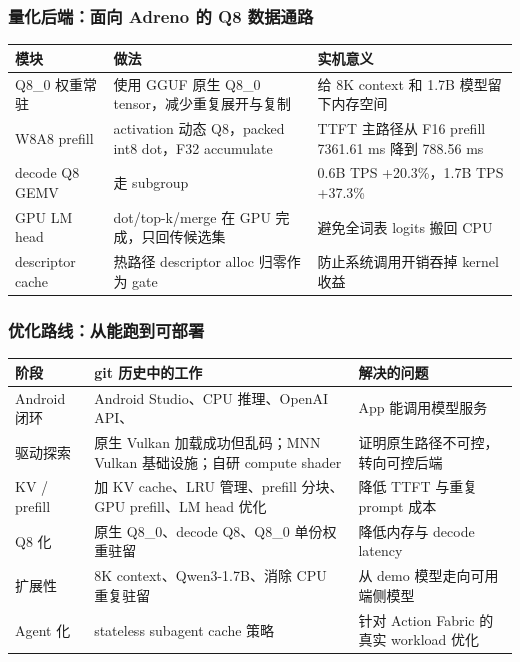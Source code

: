 \begin{frame}
  \frametitle{量化后端：面向 Adreno 的 Q8 数据通路}
  \scriptsize
  \begin{tabularx}{\textwidth}{p{}Y Y}
    \toprule
    模块 & 做法 & 实机意义 \\
    \midrule
    Q8\_0 权重常驻 & 使用 GGUF 原生 Q8\_0 tensor，减少重复展开与复制 & 给 8K context 和 1.7B 模型留下内存空间 \\
    W8A8 prefill & activation 动态 Q8，packed int8 dot，F32 accumulate & TTFT 主路径从 F16 prefill 7361.61 ms 降到 788.56 ms \\
    decode Q8 GEMV &  走 subgroup  & 0.6B TPS +20.3\%，1.7B TPS +37.3\% \\
    GPU LM head & dot/top-k/merge 在 GPU 完成，只回传候选集 & 避免全词表 logits 搬回 CPU \\
    descriptor cache & 热路径 descriptor alloc 归零作为 gate & 防止系统调用开销吞掉 kernel 收益 \\
    \bottomrule
  \end{tabularx}

  \vspace{0.45em}
  \normalsize
\end{frame}

\begin{frame}
  \frametitle{优化路线：从能跑到可部署}
  \scriptsize
  \begin{tabularx}{\textwidth}{p{}Y Y}
    \toprule
    阶段 & git 历史中的工作 & 解决的问题 \\
    \midrule
    Android 闭环 & Android Studio、CPU 推理、OpenAI API、 & App 能调用模型服务 \\
    驱动探索 & 原生 Vulkan 加载成功但乱码；MNN Vulkan 基础设施；自研 compute shader & 证明原生路径不可控，转向可控后端 \\
    KV / prefill & 加 KV cache、LRU 管理、prefill 分块、GPU prefill、LM head 优化 & 降低 TTFT 与重复 prompt 成本 \\
    Q8 化 & 原生 Q8\_0、decode Q8、Q8\_0 单份权重驻留 & 降低内存与 decode latency \\
    扩展性 & 8K context、Qwen3-1.7B、消除 CPU 重复驻留 & 从 demo 模型走向可用端侧模型 \\
    Agent 化 & stateless subagent cache 策略 & 针对 Action Fabric 的真实 workload 优化 \\
    \bottomrule
  \end{tabularx}
\end{frame}

